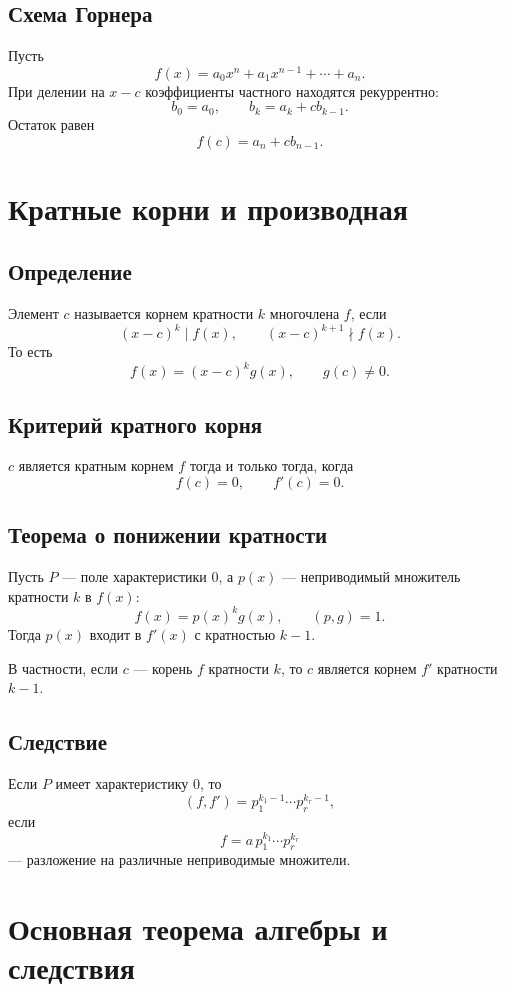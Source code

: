 \documentclass[12pt,a4paper]{article}
\begin{document}
\subsection*{Схема Горнера}

Пусть
\[
    f(x)=a_0x^n+a_1x^{n-1}+\cdots+a_n.
\]
При делении на $x-c$ коэффициенты частного находятся рекуррентно:
\[
    b_0=a_0,\qquad b_k=a_k+cb_{k-1}.
\]
Остаток равен
\[
    f(c)=a_n+cb_{n-1}.
\]

\section{Кратные корни и производная}

\subsection*{Определение}

Элемент $c$ называется корнем кратности $k$ многочлена $f$, если
\[
    (x-c)^k\mid f(x),\qquad (x-c)^{k+1}\nmid f(x).
\]
То есть
\[
    f(x)=(x-c)^kg(x),\qquad g(c)\ne0.
\]

\subsection*{Критерий кратного корня}

$c$ является кратным корнем $f$ тогда и только тогда, когда
\[
    f(c)=0,\qquad f'(c)=0.
\]

\subsection*{Теорема о понижении кратности}

Пусть $P$ --- поле характеристики $0$, а $p(x)$ --- неприводимый множитель кратности $k$ в $f(x)$:
\[
    f(x)=p(x)^kg(x),\qquad (p,g)=1.
\]
Тогда $p(x)$ входит в $f'(x)$ с кратностью $k-1$.

В частности, если $c$ --- корень $f$ кратности $k$, то $c$ является корнем $f'$ кратности $k-1$.

\subsection*{Следствие}

Если $P$ имеет характеристику $0$, то
\[
    (f,f')=p_1^{k_1-1}\cdots p_r^{k_r-1},
\]
если
\[
    f=a\,p_1^{k_1}\cdots p_r^{k_r}
\]
--- разложение на различные неприводимые множители.

\section{Основная теорема алгебры и следствия}
\end{document}
